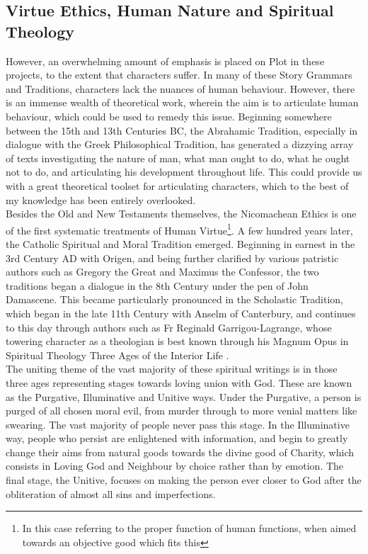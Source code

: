 \documentclass[12pt]{article}
\begin{document}
\subsection{Virtue Ethics, Human Nature and Spiritual Theology}
However, an overwhelming amount of emphasis is placed on Plot in these projects, to the extent that characters suffer. In many of these Story Grammars and Traditions, characters lack the nuances of human behaviour. However, there is an immense wealth of theoretical work, wherein the aim is to articulate human behaviour, which could be used to remedy this issue. Beginning somewhere between the 15th and 13th Centuries BC, the Abrahamic Tradition, especially in dialogue with the Greek Philosophical Tradition, has generated a dizzying array of texts investigating the nature of man, what man ought to do, what he ought not to do, and articulating his development throughout life. This could provide us with a great theoretical toolset for articulating characters, which to the best of my knowledge has been entirely overlooked. \\

Besides the Old and New Testaments themselves, the Nicomachean Ethics \cite{340BCEthicsAristotleNicomachean} is one of the first systematic treatments of Human Virtue\footnote{In this case referring to the proper function of human functions, when aimed towards an objective good which fits this}. A few hundred years later, the Catholic Spiritual and Moral Tradition emerged. Beginning in earnest in the 3rd Century AD with Origen\cite{bergsma2018catholic}, and being further clarified by various patristic authors such as Gregory the Great and Maximus the Confessor, the two traditions began a dialogue in the 8th Century under the pen of John Damascene. This became particularly pronounced in the Scholastic Tradition, which began in the late 11th Century with Anselm of Canterbury, and continues to this day through authors such as Fr Reginald Garrigou-Lagrange, whose towering character as a theologian is best known through his Magnum Opus in Spiritual Theology \: Three Ages of the Interior Life \cite{garrigou2013three}.\\

The uniting theme of the vast majority of these spiritual writings is in those three ages representing stages towards loving union with God. These are known as the Purgative, Illuminative and Unitive ways. Under the Purgative, a person is purged of all chosen moral evil, from murder through to more venial matters like swearing. The vast majority of people never pass this stage. In the Illuminative way, people who persist are enlightened with information, and begin to greatly change their aims from natural goods towards the divine good of Charity, which consists in Loving God and Neighbour by choice rather than by emotion. The final stage, the Unitive, focuses on making the person ever closer to God after the obliteration of almost all sins and imperfections. \\ 
\end{document}
